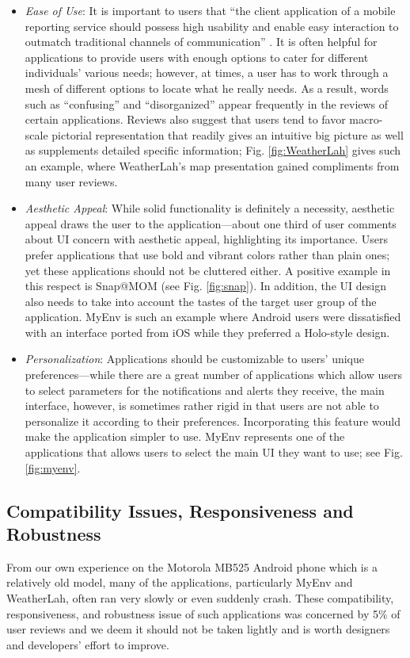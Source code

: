 \documentclass[conference,10pt]{IEEEtran}
\begin{document}
\begin{itemize}[leftmargin=1.5em]
\item {\it Ease of Use}:
It is important to users that ``the client application of a mobile reporting service should possess high usability and enable easy interaction to outmatch traditional channels of communication'' \cite{mobrep12}. It is often helpful for applications to provide users with enough options to cater for different individuals' various needs; however, at times, a user has to work through a mesh of different options to locate what he really needs. As a result, words such as ``confusing'' and ``disorganized'' appear frequently in the reviews of certain applications. Reviews also suggest that users tend to favor macro-scale pictorial representation that readily gives an intuitive big picture as well as supplements detailed specific information; Fig. \ref{fig:WeatherLah} gives such an example, where WeatherLah's map presentation gained compliments from many user reviews.
\item {\it Aesthetic Appeal}:
While solid functionality is definitely a necessity, aesthetic appeal draws the user to the application---about one third of user comments about UI concern with aesthetic appeal, highlighting its importance. Users prefer applications that use bold and vibrant colors rather than plain ones; yet these applications should not be cluttered either. A positive example in this respect is Snap@MOM (see Fig. \ref{fig:snap}). In addition, the UI design also needs to take into account the tastes of the target user group of the application. MyEnv\cite{myENV} is such an example where Android users were dissatisfied with an interface ported from iOS while they preferred a Holo-style design.
\item {\it Personalization}:
Applications should be customizable to users' unique preferences---while there are a great number of applications which allow users to select parameters for the notifications and alerts they receive, the main interface, however, is sometimes rather rigid in that users are not able to personalize it according to their preferences. Incorporating this feature would make the application simpler to use. MyEnv represents one of the applications that allows users to select the main UI they want to use; see Fig. \ref{fig:myenv}.
\end{itemize}

\subsection{Compatibility Issues, Responsiveness and Robustness}
From our own experience on the Motorola MB525 Android phone which is a relatively old model, many of the applications, particularly MyEnv and WeatherLah, often ran very slowly or even suddenly crash. These compatibility, responsiveness\cite{ictc12}, and robustness issue of such applications was concerned by 5\% of user reviews and we deem it should not be taken lightly and is worth designers and developers' effort to improve.
\end{document}
